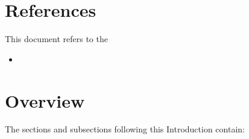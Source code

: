 
\section{References}

This document refers to the

\begin{itemize}
	\item

\end{itemize}


\section{Overview}

The sections and subsections following this Introduction contain: